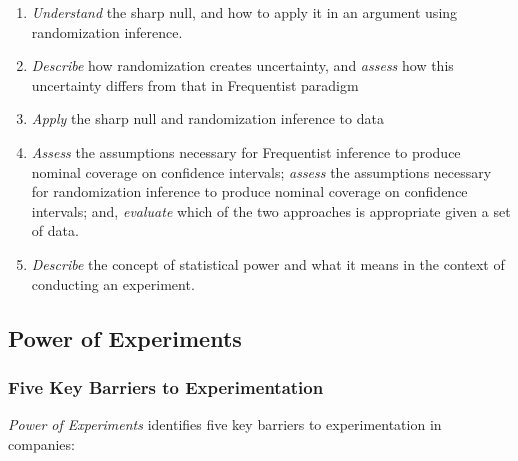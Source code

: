 \documentclass[
]{article}
\providecommand{\tightlist}{%
  \setlength{\itemsep}{0pt}\setlength{\parskip}{0pt}}
\begin{document}
\begin{enumerate}
\def\labelenumi{\arabic{enumi}.}
\tightlist
\item
  \emph{Understand} the sharp null, and how to apply it in an argument using randomization inference.
\item
  \emph{Describe} how randomization creates uncertainty, and \emph{assess} how this uncertainty differs from that in Frequentist paradigm
\item
  \emph{Apply} the sharp null and randomization inference to data
\item
  \emph{Assess} the assumptions necessary for Frequentist inference to produce nominal coverage on confidence intervals; \emph{assess} the assumptions necessary for randomization inference to produce nominal coverage on confidence intervals; and, \emph{evaluate} which of the two approaches is appropriate given a set of data.
\item
  \emph{Describe} the concept of statistical power and what it means in the context of conducting an experiment.
\end{enumerate}

\hypertarget{power-of-experiments}{%
\subsection{Power of Experiments}\label{power-of-experiments}}

\hypertarget{five-key-barriers-to-experimentation}{%
\subsubsection{Five Key Barriers to Experimentation}\label{five-key-barriers-to-experimentation}}

\emph{Power of Experiments} identifies five key barriers to experimentation in companies:
\end{document}
